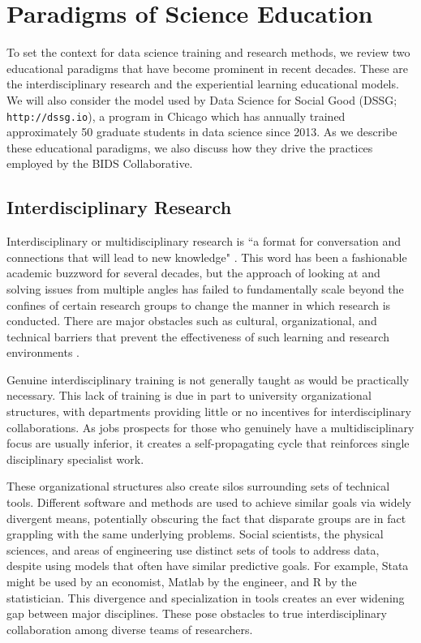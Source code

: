 \documentclass[12pt]{article}
\begin{document}
\section{Paradigms of Science Education}

To set the context for data science training and research methods, we review two educational paradigms that have become prominent in recent decades. These are the interdisciplinary research and the experiential learning educational models. We will also consider the model used by Data Science for Social Good (DSSG; \texttt{http://dssg.io}), a program in Chicago which has annually trained approximately 50 graduate students in data science since 2013. As we describe these educational paradigms, we also discuss how they drive the practices employed by the BIDS Collaborative.

\subsection{Interdisciplinary Research}

Interdisciplinary or multidisciplinary research is ``a format for conversation and connections that will lead to new knowledge" \citep{repko2008interdisciplinary}. This word has been a fashionable academic buzzword for several decades, but the approach of looking at and solving issues from multiple angles has failed to fundamentally scale beyond the confines of certain research groups to change the manner in which research is conducted. There are major obstacles such as cultural, organizational, and technical barriers that prevent the effectiveness of such learning and research environments \citep{eisenberg2000bridging}.

Genuine interdisciplinary training is not generally taught as would be practically necessary.  This lack of training is due in part to university organizational structures, with departments providing little or no incentives for interdisciplinary collaborations. As jobs prospects for those who genuinely have a multidisciplinary focus are usually inferior, it creates a self-propagating cycle that reinforces single disciplinary specialist work. 

These organizational structures also create silos surrounding sets of technical tools.  Different software and methods are used to achieve similar goals via widely divergent means, potentially obscuring the fact that disparate groups are in fact grappling with the same underlying problems. Social scientists, the physical sciences, and areas of engineering use distinct sets of tools to address data, despite using models that often have similar predictive goals. For example, Stata \citep{stata2005stata} might be used by an economist, Matlab \citep{incorporation2005matlab} by the engineer, and R \citep{RCoreTeam2014} by the statistician. This divergence and specialization in tools creates an ever widening gap between major disciplines.  These pose obstacles to true interdisciplinary collaboration among diverse teams of researchers.
\end{document}

